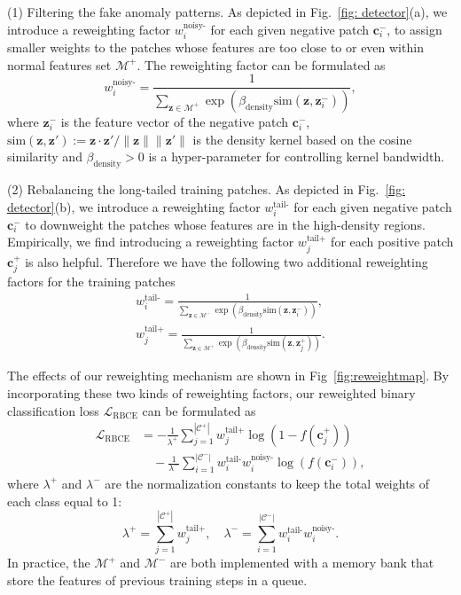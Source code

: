 \documentclass[letterpaper]{article} %
\begin{document}
(1) Filtering the fake anomaly patterns. As depicted in Fig.~\ref{fig: detector}(a), we introduce a reweighting factor $w^\text{noisy-}_i$ for each given negative patch $\bm{c}^-_i$, to assign smaller weights to the patches whose features are too close to or even within normal features set $\mathcal{M}^+$. The reweighting factor can be formulated as
\begin{equation}
    w^\text{noisy-}_i = \frac{1}{\sum_{\bm{z}\in\mathcal{M}^+} \exp(\beta_\text{density} \text{sim}(\bm{z},\bm{z}^-_i))} ,
\end{equation}
where $\bm{z}^-_i$ is the feature vector of the negative patch $\bm{c}^-_i$, $\mathrm{sim}(\bm{z}, \bm{z}'):= \bm{z} \cdot \bm{z}'/\lVert{\bm{z}}\rVert\lVert{\bm{z}'}\rVert$ is the density kernel based on the cosine similarity and $\beta_\text{density}>0$ is a hyper-parameter for controlling kernel bandwidth. 

(2) Rebalancing the long-tailed training patches. As depicted in Fig.~\ref{fig: detector}(b), we introduce a reweighting factor $w^\text{tail-}_i$ for each given negative patch $\bm{c}^-_i$ to downweight the patches whose features are in the high-density regions. Empirically, we find introducing a reweighting factor $w^\text{tail+}_j$ for each positive patch $\bm{c}^+_j$ is also helpful. Therefore we have the following two additional reweighting factors for the training patches
\begin{equation}
\begin{aligned}
    w^\text{tail-}_i = \frac{1}{\sum_{\bm{z}\in\mathcal{M}^-} \exp(\beta_\text{density} \text{sim}(\bm{z},\bm{z}^-_i))},\\
    w^\text{tail+}_j = \frac{1}{\sum_{\bm{z}\in\mathcal{M}^+} \exp(\beta_\text{density} \text{sim}(\bm{z},\bm{z}^+_j))}.
\end{aligned}
\end{equation}

The effects of our reweighting mechanism are shown in Fig~\ref{fig:reweightmap}. By incorporating these two kinds of reweighting factors, our reweighted binary classification loss $\mathcal{L}_{\mathrm{RBCE}}$ can be formulated as
\begin{equation}
\label{eq: loss_function_rbce}
\begin{aligned}
    \mathcal{L}_{\mathrm{RBCE}}&=-\frac{1}{\lambda^+}\sum_{j=1}^{|\mathcal{C}^+|} w^\text{tail+}_j\log (1-f(\bm{c}^+_j))\\
    &\quad -\frac{1}{\lambda^-}\sum_{i=1}^{|\mathcal{C}^-|} w^\text{tail-}_i w^\text{noisy-}_i \log(f(\bm{c}^-_i)),
\end{aligned}
\end{equation}
where $\lambda^+$ and $\lambda^-$ are the normalization constants to keep the total weights of each class equal to 1:
\begin{equation}
\label{eq: regularization parameter}
    \lambda^+ = \sum_{j=1}^{|\mathcal{C}^+|} w^\text{tail+}_j,\quad
    \lambda^- = \sum_{i=1}^{|\mathcal{C}^-|} w^\text{tail-}_i w^\text{noisy-}_i.
\end{equation}
In practice, the $\mathcal{M}^+$ and $\mathcal{M}^-$ are both implemented with a memory bank that store the features of previous training steps in a queue.
\end{document}

